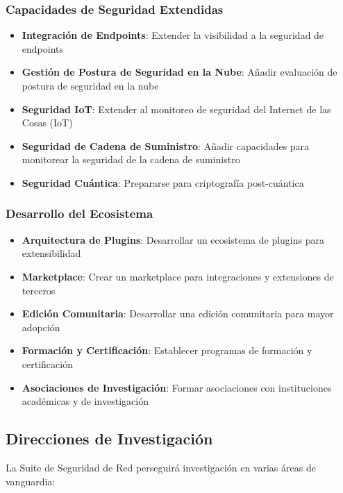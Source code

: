 \subsubsection{Capacidades de Seguridad Extendidas}
\begin{itemize}
    \item \textbf{Integración de Endpoints}: Extender la visibilidad a la seguridad de endpoints
    \item \textbf{Gestión de Postura de Seguridad en la Nube}: Añadir evaluación de postura de seguridad en la nube
    \item \textbf{Seguridad IoT}: Extender al monitoreo de seguridad del Internet de las Cosas (IoT)
    \item \textbf{Seguridad de Cadena de Suministro}: Añadir capacidades para monitorear la seguridad de la cadena de suministro
    \item \textbf{Seguridad Cuántica}: Prepararse para criptografía post-cuántica
\end{itemize}

\subsubsection{Desarrollo del Ecosistema}
\begin{itemize}
    \item \textbf{Arquitectura de Plugins}: Desarrollar un ecosistema de plugins para extensibilidad
    \item \textbf{Marketplace}: Crear un marketplace para integraciones y extensiones de terceros
    \item \textbf{Edición Comunitaria}: Desarrollar una edición comunitaria para mayor adopción
    \item \textbf{Formación y Certificación}: Establecer programas de formación y certificación
    \item \textbf{Asociaciones de Investigación}: Formar asociaciones con instituciones académicas y de investigación
\end{itemize}

\subsection{Direcciones de Investigación}
La Suite de Seguridad de Red perseguirá investigación en varias áreas de vanguardia:

